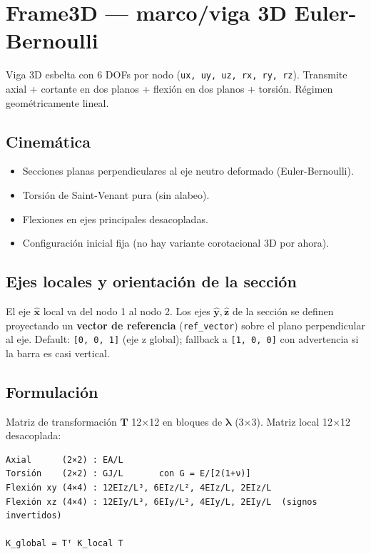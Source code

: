 \documentclass[11pt,letterpaper,oneside]{report}
\begin{document}
\section{Frame3D --- marco/viga 3D Euler-Bernoulli}

Viga 3D esbelta con 6 DOFs por nodo (\texttt{ux, uy, uz, rx, ry, rz}). Transmite axial + cortante en dos planos + flexión en dos planos + torsión. Régimen geométricamente lineal.

\subsection{Cinemática}
\begin{itemize}
  \item Secciones planas perpendiculares al eje neutro deformado (Euler-Bernoulli).
  \item Torsión de Saint-Venant pura (sin alabeo).
  \item Flexiones en ejes principales desacopladas.
  \item Configuración inicial fija (no hay variante corotacional 3D por ahora).
\end{itemize}

\subsection{Ejes locales y orientación de la sección}
El eje $\hat{\mathbf x}$ local va del nodo 1 al nodo 2. Los ejes $\hat{\mathbf y}, \hat{\mathbf z}$ de la sección se definen proyectando un \textbf{vector de referencia} (\texttt{ref\_vector}) sobre el plano perpendicular al eje. Default: \texttt{[0, 0, 1]} (eje z global); fallback a \texttt{[1, 0, 0]} con advertencia si la barra es casi vertical.

\subsection{Formulación}
Matriz de transformación $\mathbf T$ 12\ensuremath{\times}12 en bloques de $\boldsymbol{\lambda}$ (3\ensuremath{\times}3). Matriz local 12\ensuremath{\times}12 desacoplada:
\begin{lstlisting}
Axial      (2×2) : EA/L
Torsión    (2×2) : GJ/L       con G = E/[2(1+ν)]
Flexión xy (4×4) : 12EIz/L³, 6EIz/L², 4EIz/L, 2EIz/L
Flexión xz (4×4) : 12EIy/L³, 6EIy/L², 4EIy/L, 2EIy/L  (signos invertidos)

K_global = Tᵀ K_local T

\end{lstlisting}
\end{document}
